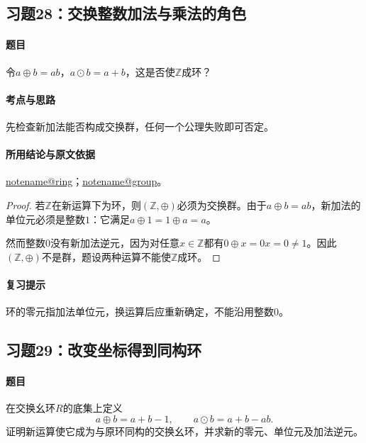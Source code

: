 \documentclass[UTF8,a4paper,11pt,fontset=windows]{ctexart}
\makeatletter
\newcommand{\Z}{\mathbb Z}\newcommand{\Q}{\mathbb Q}
\newcommand{\noteref}[1]{\hyperref[note:#1]{\csname notename@#1\endcsname}}
\newcommand{\exref}[2]{\hyperref[ex:#1:#2]{第#1章习题#2}}
\makeatother
\begin{document}
\subsection{习题28：\texorpdfstring{交换整数加法与乘法的角色}{交换整数加法与乘法的角色}}
\label{ex:1:28}

\paragraph{题目}
令$a\oplus b=ab$，$a\odot b=a+b$，这是否使$\Z$成环？

\paragraph{考点与思路}
先检查新加法能否构成交换群，任何一个公理失败即可否定。

\paragraph{所用结论与原文依据}
\noteref{ring}；\noteref{group}。


\begin{proof}
若$\Z$在新运算下为环，则$(\Z,\oplus)$必须为交换群。由于$a\oplus b=ab$，新加法的单位元必须是整数$1$：它满足$a\oplus1=1\oplus a=a$。

然而整数$0$没有新加法逆元，因为对任意$x\in\Z$都有$0\oplus x=0x=0\ne1$。因此$(\Z,\oplus)$不是群，题设两种运算不能使$\Z$成环。
\end{proof}

\paragraph{复习提示}
环的零元指加法单位元，换运算后应重新确定，不能沿用整数0。


\subsection{习题29：\texorpdfstring{改变坐标得到同构环}{改变坐标得到同构环}}
\label{ex:1:29}

\paragraph{题目}
在交换幺环$R$的底集上定义
\[
a\oplus b=a+b-1,\qquad a\odot b=a+b-ab.
\]
证明新运算使它成为与原环同构的交换幺环，并求新的零元、单位元及加法逆元。
\end{document}
